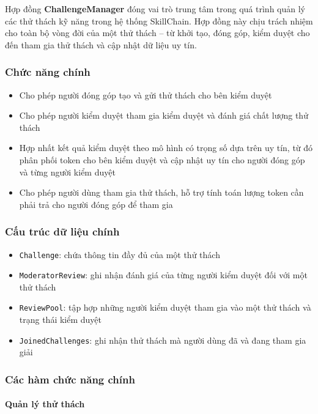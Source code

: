 Hợp đồng \textbf{ChallengeManager} đóng vai trò trung tâm trong quá trình quản lý các thử thách kỹ năng trong hệ thống SkillChain.
Hợp đồng này chịu trách nhiệm cho toàn bộ vòng đời của một thử thách -- từ khởi tạo, đóng góp, kiểm duyệt cho đến tham gia thử thách và cập nhật dữ liệu uy tín.

\subsubsection{Chức năng chính}

\begin{itemize}
  \item Cho phép người đóng góp tạo và gửi thử thách cho bên kiểm duyệt
  \item Cho phép người kiểm duyệt tham gia kiểm duyệt và đánh giá chất lượng thử thách
  \item Hợp nhất kết quả kiểm duyệt theo mô hình có trọng số dựa trên uy tín, từ đó phân phối token cho bên kiểm duyệt và cập nhật uy tín cho người đóng góp và từng người kiểm duyệt
  \item Cho phép người dùng tham gia thử thách, hỗ trợ tính toán lượng token cần phải trả cho người đóng góp để tham gia
\end{itemize}

\subsubsection{Cấu trúc dữ liệu chính}

\begin{itemize}
  \item \texttt{Challenge}: chứa thông tin đầy đủ của một thử thách
  \item \texttt{ModeratorReview}: ghi nhận đánh giá của từng người kiểm duyệt đối với một thử thách
  \item \texttt{ReviewPool}: tập hợp những người kiểm duyệt tham gia vào một thử thách và trạng thái kiểm duyệt
  \item \texttt{JoinedChallenges}: ghi nhận thử thách mà người dùng đã và đang tham gia giải
\end{itemize}

\subsubsection{Các hàm chức năng chính}

\paragraph{Quản lý thử thách}

